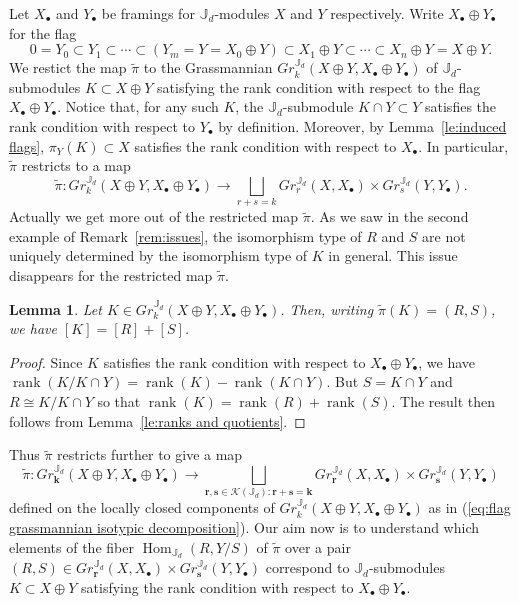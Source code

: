\documentclass{amsart}
\numberwithin{equation}{section}
\newtheorem{lemma}[theorem]{Lemma}
\theoremstyle{definition}
\def\JJ{\mathbb{J}}
\def\bfk{\mathbf{k}}
\def\bfr{\mathbf{r}}
\def\bfs{\mathbf{s}}
\def\cK{\mathcal{K}}
\def\rank{\operatorname{rank}}
\def\Hom{\operatorname{Hom}}
\renewcommand{\eqref}[1]{{\rm (\ref{#1})}}
\begin{document}
Let $X_\bullet$ and $Y_\bullet$ be framings for $\JJ_d$-modules $X$ and $Y$ respectively.  Write $X_\bullet\oplus Y_\bullet$ for the flag 
\[0=Y_0\subset Y_1\subset\cdots\subset (Y_m=Y=X_0\oplus Y)\subset X_1\oplus Y\subset\cdots\subset X_n\oplus Y=X\oplus Y.\]
We restict the map $\tilde\pi$ to the Grassmannian $Gr_k^{\JJ_d}(X\oplus Y,X_\bullet\oplus Y_\bullet)$ of $\JJ_d$-submodules $K\subset X\oplus Y$ satisfying the rank condition with respect to the flag $X_\bullet\oplus Y_\bullet$.  Notice that, for any such $K$, the $\JJ_d$-submodule $K\cap Y\subset Y$ satisfies the rank condition with respect to $Y_\bullet$ by definition.  Moreover, by Lemma~\ref{le:induced flags}, $\pi_Y(K)\subset X$ satisfies the rank condition with respect to $X_\bullet$.  In particular, $\tilde\pi$ restricts to a map
\[\tilde\pi:Gr_k^{\JJ_d}(X\oplus Y,X_\bullet\oplus Y_\bullet)\to\bigsqcup_{r+s=k} Gr_r^{\JJ_d}(X,X_\bullet)\times Gr_s^{\JJ_d}(Y,Y_\bullet).\]
Actually we get more out of the restricted map $\tilde\pi$.  As we saw in the second example of Remark~\ref{rem:issues}, the isomorphism type of $R$ and $S$ are not uniquely determined by the isomorphism type of $K$ in general.  This issue disappears for the restricted map $\tilde\pi$.
\begin{lemma}
  Let $K\in Gr_k^{\JJ_d}(X\oplus Y,X_\bullet\oplus Y_\bullet)$.  Then, writing $\tilde\pi(K)=(R,S)$, we have $[K]=[R]+[S]$.
\end{lemma}
\begin{proof}
  Since $K$ satisfies the rank condition with respect to $X_\bullet\oplus Y_\bullet$, we have $\rank(K/K\cap Y)=\rank(K)-\rank(K\cap Y)$.  But $S=K\cap Y$ and $R\cong K/K\cap Y$ so that $\rank(K)=\rank(R)+\rank(S)$.  The result then follows from Lemma~\ref{le:ranks and quotients}. 
\end{proof}
Thus $\tilde\pi$ restricts further to give a map
\begin{equation}\label{eq:isotypic flag grassmannian fibration}
  \tilde\pi:Gr_\bfk^{\JJ_d}(X\oplus Y,X_\bullet\oplus Y_\bullet)\to\bigsqcup_{\bfr,\bfs\in\cK(\JJ_d):\bfr+\bfs=\bfk} Gr_\bfr^{\JJ_d}(X,X_\bullet)\times Gr_\bfs^{\JJ_d}(Y,Y_\bullet)
\end{equation}
defined on the locally closed components of $Gr_k^{\JJ_d}(X\oplus Y,X_\bullet\oplus Y_\bullet)$ as in \eqref{eq:flag grassmannian isotypic decomposition}.  Our aim now is to understand which elements of the fiber $\Hom_{\JJ_d}(R,Y/S)$ of $\tilde\pi$ over a pair $(R,S)\in Gr_\bfr^{\JJ_d}(X,X_\bullet)\times Gr_\bfs^{\JJ_d}(Y,Y_\bullet)$ correspond to $\JJ_d$-submodules $K\subset X\oplus Y$ satisfying the rank condition with respect to $X_\bullet\oplus Y_\bullet$.  
\end{document}
